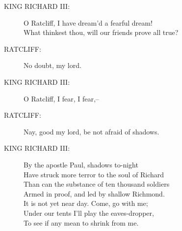 \documentclass{article}
\begin{document}
\begin{description}
\item[KING RICHARD III:] 
\hspace{1pt}O Ratcliff, I have dream'd a fearful dream!\\
\hspace{1pt}What thinkest thou, will our friends prove all true?\\
\end{description}
\begin{description}
\item[RATCLIFF:] 
\hspace{1pt}No doubt, my lord.\\
\end{description}
\begin{description}
\item[KING RICHARD III:] 
\hspace{1pt}O Ratcliff, I fear, I fear,--\\
\end{description}
\begin{description}
\item[RATCLIFF:] 
\hspace{1pt}Nay, good my lord, be not afraid of shadows.\\
\end{description}
\begin{description}
\item[KING RICHARD III:] 
\hspace{1pt}By the apostle Paul, shadows to-night\\
\hspace{1pt}Have struck more terror to the soul of Richard\\
\hspace{1pt}Than can the substance of ten thousand soldiers\\
\hspace{1pt}Armed in proof, and led by shallow Richmond.\\
\hspace{1pt}It is not yet near day. Come, go with me;\\
\hspace{1pt}Under our tents I'll play the eaves-dropper,\\
\hspace{1pt}To see if any mean to shrink from me.\\
\end{description}
\centering{\it [Exeunt]}\\
\\
\end{document}
